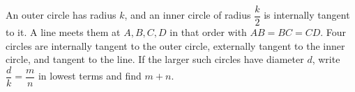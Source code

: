 An outer circle has radius $k$, and an inner circle of radius $\dfrac{k}{2}$ is internally tangent to it. A line meets them at $A,B,C,D$ in that order with $AB=BC=CD$. Four circles are internally tangent to the outer circle, externally tangent to the inner circle, and tangent to the line. If the larger such circles have diameter $d$, write $\dfrac{d}{k}=\dfrac{m}{n}$ in lowest terms and find $m+n$.
